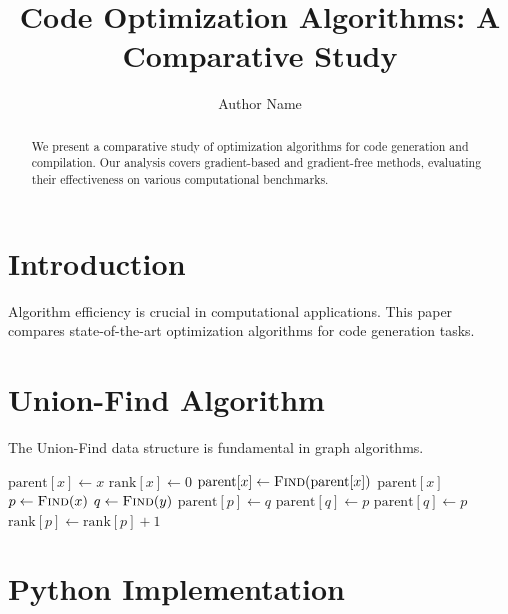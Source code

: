 \documentclass{article}
\title{Code Optimization Algorithms: A Comparative Study}
\author{Author Name}
\begin{document}
\maketitle

\begin{abstract}
We present a comparative study of optimization algorithms for code generation
and compilation. Our analysis covers gradient-based and gradient-free methods,
evaluating their effectiveness on various computational benchmarks.
\end{abstract}

\section{Introduction}

Algorithm efficiency is crucial in computational applications. This paper
compares state-of-the-art optimization algorithms for code generation tasks.

\section{Union-Find Algorithm}

The Union-Find data structure is fundamental in graph algorithms.

\begin{algorithm}[p]
  \caption{Union-Find with Path Compression}
  \begin{algorithmic}[1]
      \State $\text{parent}[x] \gets x$
      \State $\text{rank}[x] \gets 0$
    \EndFunction
    \Statex
        \State $\text{parent}[x] \gets \Call{Find}{\text{parent}[x]}$
      \EndIf
      \State \Return $\text{parent}[x]$
    \EndFunction
    \Statex
      \State $p \gets \Call{Find}{x}$
      \State $q \gets \Call{Find}{y}$
        \State \Return
      \EndIf
        \State $\text{parent}[p] \gets q$
        \State $\text{parent}[q] \gets p$
      \Else
        \State $\text{parent}[q] \gets p$
        \State $\text{rank}[p] \gets \text{rank}[p] + 1$
      \EndIf
    \EndFunction
  \end{algorithmic}
\end{algorithm}

\section{Python Implementation}
\end{document}
